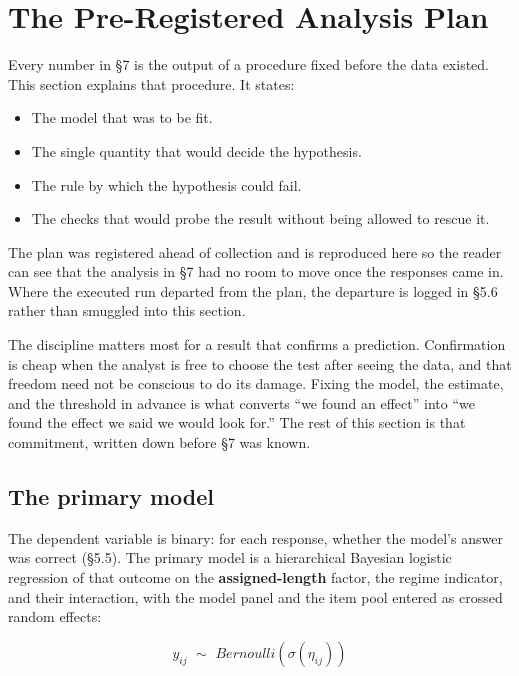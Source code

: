 \documentclass{article}
\begin{document}
\section{The Pre-Registered Analysis
Plan}\label{chapter-6-the-pre-registered-analysis-plan}

Every number in \S{}7 is the output of a procedure fixed before the data
existed. This section explains that procedure. It states:

\begin{itemize}
\item
  The model that was to be fit.
\item
  The single quantity that would decide the hypothesis.
\item
  The rule by which the hypothesis could fail.
\item
  The checks that would probe the result without being allowed to rescue
  it.
\end{itemize}

The plan was registered ahead of collection and is reproduced here so
the reader can see that the analysis in \S{}7 had no room to move once the
responses came in. Where the executed run departed from the plan, the
departure is logged in \S{}5.6 rather than smuggled into this section.

The discipline matters most for a result that confirms a prediction.
Confirmation is cheap when the analyst is free to choose the test after
seeing the data, and that freedom need not be conscious to do its
damage. Fixing the model, the estimate, and the threshold in advance is
what converts ``we found an effect'' into ``we found the effect we said
we would look for.'' The rest of this section is that commitment,
written down before \S{}7 was known.

\subsection{The primary model}\label{the-primary-model}

The dependent variable is binary: for each response, whether the model's
answer was correct (\S{}5.5). The primary model is a hierarchical Bayesian
logistic regression of that outcome on the \textbf{assigned-length}
factor, the regime indicator, and their interaction, with the model
panel and the item pool entered as crossed random effects:

\[y_{ij}\mspace{6mu} \sim \mspace{6mu} Bernoulli\left( \sigma(\eta_{ij}) \right)\]
\end{document}
